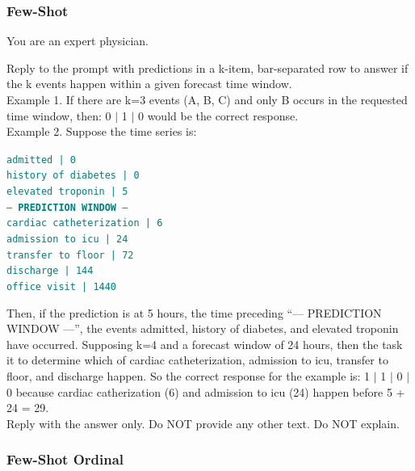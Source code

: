 \subsubsection{Few-Shot}
\begin{tcolorbox}[breakable,colback=gray!5, colframe=gray!100, title=Prompt, boxrule=2pt]

{You are an expert physician.}

{Reply to the prompt with predictions in a k-item, bar-separated row to answer if the k events happen within a given forecast time window. \\

Example 1. If there are k=3 events (A, B, C) and only B occurs in the requested time window, then:
0 $\mid$ 1 $\mid$ 0
would be the correct response.}\\

{Example 2. Suppose the time series is:}

\noindent \texttt{\textcolor{teal}
{admitted | 0 \\
history of diabetes | 0 \\
elevated troponin | 5 \\
--- \textbf{PREDICTION WINDOW} --- \\
cardiac catheterization | 6 \\
admission to icu | 24 \\ 
transfer to floor | 72\\ 
discharge | 144\\ 
office visit | 1440}
}

{Then, if the prediction is at 5 hours, the time preceding ``--- PREDICTION WINDOW ---'', the events admitted, history of diabetes, and elevated troponin have occurred.  Supposing k=4 and a forecast window of 24 hours, then the task it to determine which of cardiac catheterization, admission to icu, transfer to floor, and discharge happen. So the correct response for the example is:
1 $\mid$ 1 $\mid$ 0 $\mid$ 0
because cardiac catherization (6) and admission to icu (24) happen before 5 + 24 = 29.}\\

{Reply with the answer only. Do NOT provide any other text. Do NOT explain.}

\end{tcolorbox}

\subsubsection{Few-Shot Ordinal}

